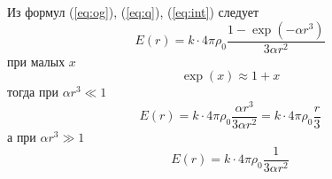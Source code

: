 \documentclass[a5paper,10pt]{article}
\begin{document}
Из формул (\ref{eq:og}), (\ref{eq:q}), (\ref{eq:int}) следует
\begin{equation}
	E(r)=
	k\cdot4\pi\rho_0\frac{1-\exp\left(-\alpha r^3\right)}{3 \alpha r^2}
\end{equation}
при малых $x$
\begin{equation}
	\exp(x)\approx 1+x
\end{equation}
тогда при $\alpha r^3 \ll 1$
\begin{equation}
	E(r)=
	k\cdot4\pi\rho_0\frac{\alpha r^3}{3 \alpha r^2}=
	k\cdot4\pi\rho_0\frac{r}{3}
\end{equation}
а при $\alpha r^3 \gg 1$
\begin{equation}
	E(r)=
	k\cdot4\pi\rho_0\frac{1}{3 \alpha r^2}
\end{equation}
\end{document}
